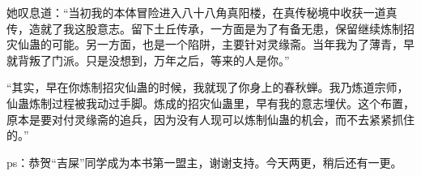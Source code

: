 \begin{this_body}
她叹息道：“当初我的本体冒险进入八十八角真阳楼，在真传秘境中收获一道真传，造就了我这股意志。留下土丘传承，一方面是为了有备无患，保留继续炼制招灾仙蛊的可能。另一方面，也是一个陷阱，主要针对灵缘斋。当年我为了薄青，早就背叛了门派。只是没想到，万年之后，等来的人是你。”

“其实，早在你炼制招灾仙蛊的时候，我就现了你身上的春秋蝉。我乃炼道宗师，仙蛊炼制过程被我动过手脚。炼成的招灾仙蛊里，早有我的意志埋伏。这个布置，原本是要对付灵缘斋的追兵，因为没有人现可以炼制仙蛊的机会，而不去紧紧抓住的。”

ps：恭贺“吉屎”同学成为本书第一盟主，谢谢支持。今天两更，稍后还有一更。

\end{this_body}

